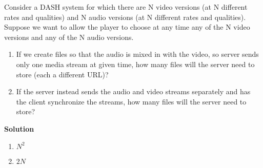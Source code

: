\documentclass[12pt,letterpaper]{ctexart}
\begin{document}
Consider a DASH system for which there are N video versions (at N different rates and qualities) and N audio versions (at N different rates and qualities). Suppose we want to allow the player to choose at any time any of the N video versions and any of the N audio versions.


\begin{enumerate}
  \item If we create files so that the audio is mixed in with the video, so server sends only one media stream at given time, how many files will the server need to store (each a different URL)?
  \item If the server instead sends the audio and video streams separately and has the client synchronize the streams, how many files will the server need to store?
\end{enumerate}

{\bf Solution}

\begin{enumerate}
  \item $N^2$
  \item $2N$
\end{enumerate}
\end{document}
